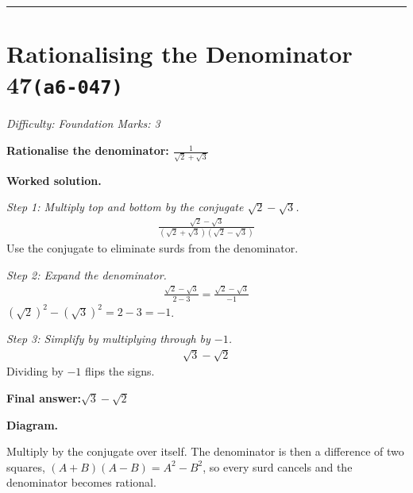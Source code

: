 \documentclass[11pt]{article}
\newcommand{\question}[1]{\par\medskip\noindent\textbf{#1}\par}
\begin{document}
\medskip\hrule

\section*{Rationalising the Denominator 47\quad\small\texttt{(a6-047)}}
\textit{Difficulty: Foundation \quad\textbar\quad Marks: 3}

\question{Rationalise the denominator: \( \frac{1}{\sqrt{2} + \sqrt{3}} \)}

\textbf{Worked solution.}

\textit{Step 1: Multiply top and bottom by the conjugate \( \sqrt{2} - \sqrt{3} \).}
\[\begin{gathered}
\frac{\sqrt{2} - \sqrt{3}}{(\sqrt{2} + \sqrt{3})(\sqrt{2} - \sqrt{3})}
\end{gathered}\]
Use the conjugate to eliminate surds from the denominator.

\textit{Step 2: Expand the denominator.}
\[\begin{gathered}
\frac{\sqrt{2} - \sqrt{3}}{2 - 3} = \frac{\sqrt{2} - \sqrt{3}}{-1}
\end{gathered}\]
\( (\sqrt{2})^2 - (\sqrt{3})^2 = 2 - 3 = -1 \).

\textit{Step 3: Simplify by multiplying through by \( -1 \).}
\[\begin{gathered}
\sqrt{3} - \sqrt{2}
\end{gathered}\]
Dividing by \( -1 \) flips the signs.

\begin{answerbox}
\textbf{Final answer:}\quad \(\displaystyle \sqrt{3} - \sqrt{2}\)
\end{answerbox}
\textbf{Diagram.}

\begin{center}
\end{center}
\small Multiply by the conjugate over itself. The denominator is then a difference of two squares, $(A+B)(A-B)=A^{2}-B^{2}$, so every surd cancels and the denominator becomes rational.\normalsize
\end{document}
